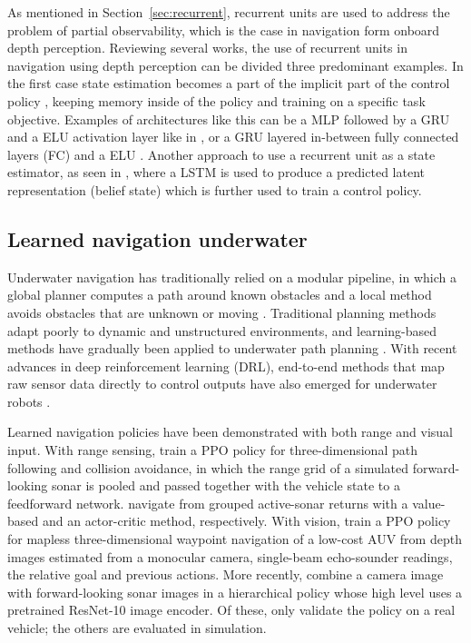 As mentioned in Section~\ref{sec:recurrent}, recurrent units are used to address the problem of partial observability, which is the case in navigation form onboard depth perception.  Reviewing several works, the use of recurrent units in navigation using depth perception can be divided three predominant examples. In the first case state estimation becomes a part of the implicit part of the control policy \parencite{ha2025learning}, keeping memory inside of the policy and training on a specific task objective. Examples of architectures like this can be a MLP followed by a GRU  and a ELU activation layer like in \textcite{kulkarni2024dce}, or a GRU layered in-between fully connected layers (FC) and a ELU \parencite{sawant2026crossmodal}. Another approach to use a recurrent unit as a state estimator, as seen in \textcite{hoeller2021learning}, where a LSTM is used to produce a predicted latent  representation  (belief state) which is further used to train a control policy.

\subsection{Learned navigation underwater}
\label{sec:rw-underwater}
Underwater navigation has traditionally relied on a modular pipeline, in which a global planner computes a path around known obstacles and a local method avoids obstacles that are unknown or moving \parencite{sha2021path}. Traditional planning methods adapt poorly to dynamic and unstructured environments, and learning-based methods have gradually been applied to underwater path planning \parencite{an2023intelligent}. With recent advances in deep reinforcement learning (DRL), end-to-end methods that map raw sensor data directly to control outputs have also emerged for underwater robots \parencite{yang2022monocular}.

Learned navigation policies have been demonstrated with both range and visual input. With range sensing, \textcite{havenstrom2021deep} train a PPO policy for three-dimensional path following and collision avoidance, in which the range grid of a simulated forward-looking sonar is pooled and passed together with the vehicle state to a feedforward network. \textcite{yuan2021auv, yuan2023auv} navigate from grouped active-sonar returns with a value-based and an actor-critic method, respectively. With vision, \textcite{yang2022monocular} train a PPO policy for mapless three-dimensional waypoint navigation of a low-cost AUV from depth images estimated from a monocular camera, single-beam echo-sounder readings, the relative goal and previous actions. More recently, \textcite{shafer2026endtoend} combine a camera image with forward-looking sonar images in a hierarchical policy whose high level uses a pretrained ResNet-10 image encoder. Of these, only \textcite{yang2022monocular} validate the policy on a real vehicle; the others are evaluated in simulation.

